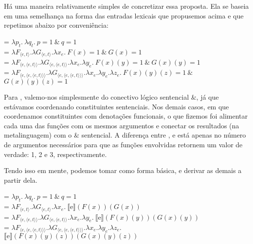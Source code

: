Há uma maneira relativamente simples de concretizar essa proposta.
Ela se baseia em uma semelhan\-ça na forma das entradas lexicais
que propusemos acima e que repetimos abaixo por conveniência:

\begin{exe}
	\ex {} = $\lambda p_{t}.\ \lambda q_{t}.\ p=1\  \&\ q=1$\\
		 = $\lambda F_{\langle e,t\rangle}.\lambda G_{\langle e,t\rangle}.\lambda x_{e}.\ F(x)=1\ \&\ G(x)=1$\\
		 = $\lambda F_{\langle e,\langle e,t\rangle\rangle}.\lambda G_{\langle e,\langle e,t\rangle\rangle}.\lambda x_{e}.\lambda y_{e}.\ F(x)(y)=1\ \&\ G(x)(y)=1$\\
		 = $\lambda F_{\langle e,\langle e, \langle e,t\rangle\rangle\rangle}.\lambda G_{\langle e,\langle e, \langle e,t\rangle\rangle\rangle}.\lambda x_{e}.\lambda y_{e}.\lambda z_{e}.\ F(x)(y)(z)=1\ \& $ \\ \hspace*{\fill} $G(x)(y)(z)=1$
\end{exe}


\n Para , valemo-nos simplesmente do conectivo lógico
sentencial $\&$, já que estávamos coordenando constituintes
sentenciais. Nos demais casos, em que coordenamos constituintes com
denota\-çõ\-es funcionais, o que fizemos foi alimentar cada uma das
fun\-çõ\-es com os mesmos argumentos e conectar os resultados (na
metalinguagem) com o $\&$ sentencial. A diferen\-ça entre
,  e  está apenas no número de
argumentos necessários para que as fun\-çõ\-es
envolvidas retornem um valor de verdade: 1, 2 e 3, respectivamente. 

Tendo isso em mente, podemos tomar  como forma básica, e
derivar as demais a partir dela.

\begin{exe}
	\ex {} = $\lambda p_{t}.\ \lambda q_{t}.\ p=1\ \&\ q=1$\\
		 = $\lambda F_{\langle e,t\rangle}.\lambda G_{\langle e,t\rangle}.\lambda x_{e}.\ \llbracket \text{e} \rrbracket (F(x))(G(x))$\\
		 = $\lambda F_{\langle e,\langle e,t\rangle\rangle}.\lambda G_{\langle e,\langle e,t\rangle\rangle}.\lambda x_{e}.\lambda y_{e}.\ \llbracket \text{e} \rrbracket (F(x)(y))(G(x)(y))$\\
		 = $\lambda F_{\langle e,\langle e, \langle e,t\rangle\rangle\rangle}.\lambda G_{\langle e,\langle e, \langle e,t\rangle\rangle\rangle}.\lambda x_{e}.\lambda y_{e}.\lambda z_{e}. $ \\
		\hspace*{\fill} $\llbracket \text{e} \rrbracket (F(x)(y)(z))(G(x)(y)(z))$
\end{exe}

